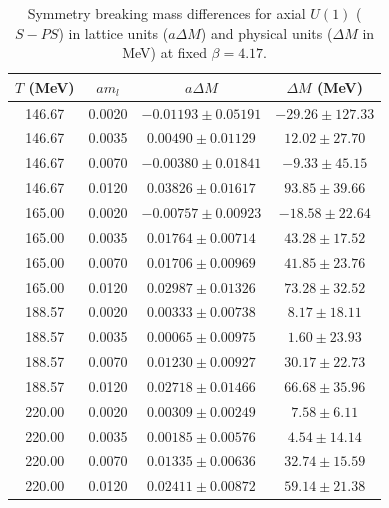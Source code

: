 \begin{table}[H]
\centering
\renewcommand{\arraystretch}{1.2}
\caption{Symmetry breaking mass differences for axial $U(1)$ ($S-PS$) in lattice units ($a\Delta M$) and physical units ($\Delta M$ in MeV) at fixed $\beta=4.17$.}
\label{tab:u1_s_ps_asym_data}
\begin{tabular}{cccc}
\hline\hline
$T$ (MeV) & $am_l$ & $a\Delta M$ & $\Delta M$ (MeV) \\
\hline
146.67 & 0.0020 & $-0.01193 \pm 0.05191$ & $-29.26 \pm 127.33$ \\
146.67 & 0.0035 & $0.00490 \pm 0.01129$ & $12.02 \pm 27.70$ \\
146.67 & 0.0070 & $-0.00380 \pm 0.01841$ & $-9.33 \pm 45.15$ \\
146.67 & 0.0120 & $0.03826 \pm 0.01617$ & $93.85 \pm 39.66$ \\
\hline
165.00 & 0.0020 & $-0.00757 \pm 0.00923$ & $-18.58 \pm 22.64$ \\
165.00 & 0.0035 & $0.01764 \pm 0.00714$ & $43.28 \pm 17.52$ \\
165.00 & 0.0070 & $0.01706 \pm 0.00969$ & $41.85 \pm 23.76$ \\
165.00 & 0.0120 & $0.02987 \pm 0.01326$ & $73.28 \pm 32.52$ \\
\hline
188.57 & 0.0020 & $0.00333 \pm 0.00738$ & $8.17 \pm 18.11$ \\
188.57 & 0.0035 & $0.00065 \pm 0.00975$ & $1.60 \pm 23.93$ \\
188.57 & 0.0070 & $0.01230 \pm 0.00927$ & $30.17 \pm 22.73$ \\
188.57 & 0.0120 & $0.02718 \pm 0.01466$ & $66.68 \pm 35.96$ \\
\hline
220.00 & 0.0020 & $0.00309 \pm 0.00249$ & $7.58 \pm 6.11$ \\
220.00 & 0.0035 & $0.00185 \pm 0.00576$ & $4.54 \pm 14.14$ \\
220.00 & 0.0070 & $0.01335 \pm 0.00636$ & $32.74 \pm 15.59$ \\
220.00 & 0.0120 & $0.02411 \pm 0.00872$ & $59.14 \pm 21.38$ \\
\hline\hline
\end{tabular}
\end{table}

